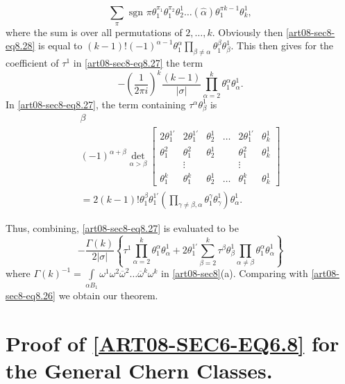 \begin{equation*}
\sum\limits_{\pi}\text{ sgn } \pi\theta^{\pi_{1}}_{1}\theta^{\pi_{2}}_{1}\theta^{1}_{2}\ldots(\widehat{\alpha})\theta^{\pi k-1}_{1}\theta^{1}_{k},\tag{8.28}\label{art08-sec8-eq8.28}
\end{equation*}
where the sum is over all permutations of $2,\ldots, k$. Obviously then \eqref{art08-sec8-eq8.28} is equal to $(k-1)!(-1)^{\alpha-1}\theta^{\alpha}_{1}\prod\limits_{\beta\neq \alpha}\theta^{\beta}_{1}\theta^{1}_{\beta}$. This then gives for the coefficient of $\tau^{1}$ in \eqref{art08-sec8-eq8.27} the term
\begin{equation*}
-\left(\dfrac{1}{2\pi i}\right)^{k}\dfrac{(k-1)}{|\sigma|}\prod\limits^{k}_{\alpha=2}\theta^{\alpha}_{1}\theta^{1}_{\alpha}.\tag{8.29}\label{art08-sec8-eq8.29}
\end{equation*}
In \eqref{art08-sec8-eq8.27}, the term containing $\tau^{\alpha}\theta^{1}_{\beta}$ is 
\begin{gather*}
\beta\\
(-1)^{\alpha+\beta}\det_{\alpha>\beta}
\begin{bmatrix}
2\theta^{1'}_{1} & 2\theta^{1'}_{1} & \theta^{1}_{2} & \ldots & 2\theta^{1'}_{1} & \theta^{1}_{k}\\
\theta^{2}_{1} & \theta^{2}_{1} & \theta^{1}_{2} & & \theta^{2}_{1} & \theta^{1}_{k}\\
 & \vdots & & & \vdots & \\
\theta^{k}_{1} & \theta^{k}_{1} & \theta^{1}_{2} & \ldots & \theta^{k}_{1} & \theta^{1}_{k}
\end{bmatrix}\\
=2(k-1)!\theta^{\beta}_{1}\theta^{1'}_{1}\left(\prod\limits_{\gamma\neq \beta,\alpha}\theta^{\gamma}_{1}\theta^{1}_{\gamma}\right)\theta^{1}_{\alpha}.
\end{gather*}

Thus, combining, \eqref{art08-sec8-eq8.27} is evaluated to be
$$
-\dfrac{\Gamma(k)}{2|\sigma|}\left\{\tau^{1}\prod\limits^{k}_{\alpha=2}\theta^{\alpha}_{1}\theta^{1}_{\alpha}+2\theta^{1'}_{1}\sum\limits^{k}_{\beta=2}\tau^{\beta}\theta^{1}_{\beta}\prod\limits_{\alpha\neq \beta}\theta^{\alpha}_{1}\theta^{1}_{\alpha}\right\}
$$
where $\Gamma(k)^{-1}=\int\limits_{\alpha B_{1}}\omega^{1}\omega^{2}\overline{\omega}^{2}\ldots\overline{\omega}^{k}\omega^{k}$ in \ref{art08-sec8}(a). Comparing with \eqref{art08-sec8-eq8.26} we obtain our theorem.

\section{Proof of \texorpdfstring{\eqref{ART08-SEC6-EQ6.8}}{eq6.8} for the General Chern Classes.}\label{art08-sec9}

